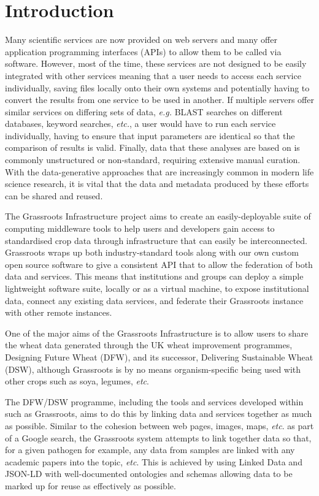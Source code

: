 \documentclass[12pt,a4paper]{extarticle}
\begin{document}
\clearpage
\pagestyle{main}
\section*{Introduction}

Many scientific services are now provided on web servers and many offer application programming interfaces (APIs) to allow them to be called via software. 
However, most of the time, these services are not designed to be easily integrated with other services meaning that a user needs to access each service individually, saving files locally onto their own systems and potentially having to convert the results from one service to be used in another. 
If multiple servers offer similar services on differing sets of data, \textit{e.g.} BLAST searches on different databases, keyword searches, \textit{etc.}, a user would have to run each service individually, having to ensure that input parameters are identical so that the comparison of results is valid. 
Finally, data that these analyses are based on is commonly unstructured or non-standard, requiring extensive manual curation.
With the data-generative approaches that are increasingly common in modern life science research, it is vital that the data and metadata produced by these efforts can be shared and reused.




The Grassroots Infrastructure project aims to create an easily-deployable suite of computing middleware tools to help users and developers gain access to standardised crop data through infrastructure that can easily be interconnected.
Grassroots wraps up both industry-standard tools along with our own custom open source software to give a consistent API that to allow the federation of both data and services.
This means that institutions and groups can deploy a simple lightweight software suite, locally or as a virtual machine, to expose institutional data, connect any existing data services, and federate their Grassroots instance with other remote instances.

One of the major aims of the Grassroots Infrastructure is to allow users to share the wheat data generated through the UK wheat improvement programmes, Designing Future Wheat (DFW), and its successor, Delivering Sustainable Wheat (DSW), although Grassroots is by no means organism-specific being used with other crops such as soya, legumes, \textit{etc}.

The DFW/DSW programme, including the tools and services developed within such as Grassroots, aims to do this by linking data and services together as much as possible. Similar to the cohesion between web pages, images, maps, \textit{etc}. as part of a Google search, the Grassroots system attempts to link together data so that, for a given pathogen for example, any data from samples are linked with any academic papers into the topic, \textit{etc}.
This is achieved by using Linked Data and JSON-LD with well-documented ontologies and schemas allowing data to be marked up for reuse as effectively as possible.
\end{document}
